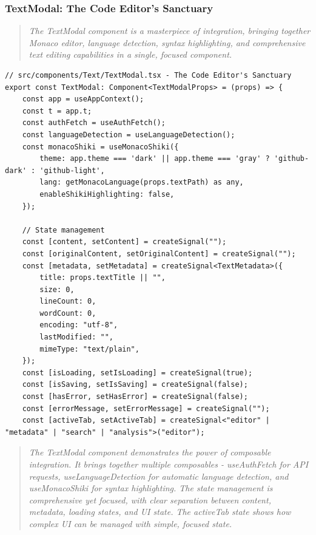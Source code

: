 \documentclass[11pt]{article}
\begin{document}
\subsubsection{TextModal: The Code Editor's Sanctuary}

\begin{quote}
\emph{The TextModal component is a masterpiece of integration, bringing together Monaco editor, language detection, syntax highlighting, and comprehensive text editing capabilities in a single, focused component.}
\end{quote}

\begin{lstlisting}[style=typescript]
// src/components/Text/TextModal.tsx - The Code Editor's Sanctuary
export const TextModal: Component<TextModalProps> = (props) => {
    const app = useAppContext();
    const t = app.t;
    const authFetch = useAuthFetch();
    const languageDetection = useLanguageDetection();
    const monacoShiki = useMonacoShiki({
        theme: app.theme === 'dark' || app.theme === 'gray' ? 'github-dark' : 'github-light',
        lang: getMonacoLanguage(props.textPath) as any,
        enableShikiHighlighting: false,
    });

    // State management
    const [content, setContent] = createSignal("");
    const [originalContent, setOriginalContent] = createSignal("");
    const [metadata, setMetadata] = createSignal<TextMetadata>({
        title: props.textTitle || "",
        size: 0,
        lineCount: 0,
        wordCount: 0,
        encoding: "utf-8",
        lastModified: "",
        mimeType: "text/plain",
    });
    const [isLoading, setIsLoading] = createSignal(true);
    const [isSaving, setIsSaving] = createSignal(false);
    const [hasError, setHasError] = createSignal(false);
    const [errorMessage, setErrorMessage] = createSignal("");
    const [activeTab, setActiveTab] = createSignal<"editor" | "metadata" | "search" | "analysis">("editor");
\end{lstlisting}

\begin{quote}
\emph{The TextModal component demonstrates the power of composable integration. It brings together multiple composables - useAuthFetch for API requests, useLanguageDetection for automatic language detection, and useMonacoShiki for syntax highlighting. The state management is comprehensive yet focused, with clear separation between content, metadata, loading states, and UI state. The activeTab state shows how complex UI can be managed with simple, focused state.}
\end{quote}
\end{document}
